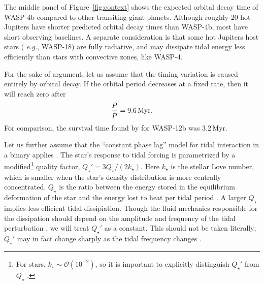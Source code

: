 \documentclass[12pt,twocolumn,tighten]{aastex62}
\begin{document}
The middle panel of Figure~\ref{fig:context} shows the expected
orbital decay time of WASP-4b compared to other transiting giant
planets.  Although roughly 20 hot Jupiters have shorter predicted
orbital decay times than WASP-4b, most have short observing baselines.
A separate consideration is that some hot Jupiters host stars ({\it
e.g.}, WASP-18) are fully radiative, and may dissipate tidal energy
less efficiently than stars with convective zones, like WASP-4.

For the sake of argument, let us assume that the timing variation is
caused entirely by orbital decay.  If the orbital period decreases
at a fixed rate, then it will reach zero after
\begin{equation}
  \frac{P}{ \dot{P} } = 9.6 \, {\rm Myr}.
\end{equation}
For comparison, the survival time found by \citet{patra_2017} for
WASP-12b was 3.2\,Myr.

Let us further assume that the ``constant phase lag'' model for tidal
interaction in a binary applies \citep{zahn_tidal_1977}.  The star's
response to tidal forcing is parametrized by a modified\footnote{For
stars, $k_\star \sim \mathcal{O}(10^{-2})$, so it is important to
explicitly distinguish $Q_\star'$ from $Q_\star$ \citep[{\it
e.g.},][]{schwarzschild_structure_1958}.} quality factor, $Q_\star' =
3 Q_\star / (2k_\star)$.  Here $k_\star$ is the stellar Love number,
which is smaller when the star's density distribution is more
centrally concentrated. $Q_\star$ is the ratio between the energy
stored in the equilibrium deformation of the star and the energy lost
to heat per tidal period \citep[{\it e.g.},][]{goldreich_q_1966}.  A
larger $Q_\star$ implies less efficient tidal dissipiation.  Though
the fluid mechanics responsible for the dissipation should depend on
the amplitude and frequency of the tidal perturbation
\citep[][Section~3.3]{ogilvie_tidal_2014}, we will treat $Q_\star'$ as
a constant.  This should not be taken literally; $Q_\star'$ may in
fact change sharply as the tidal frequency changes
\citep{penev_empirical_2018}.
\end{document}

